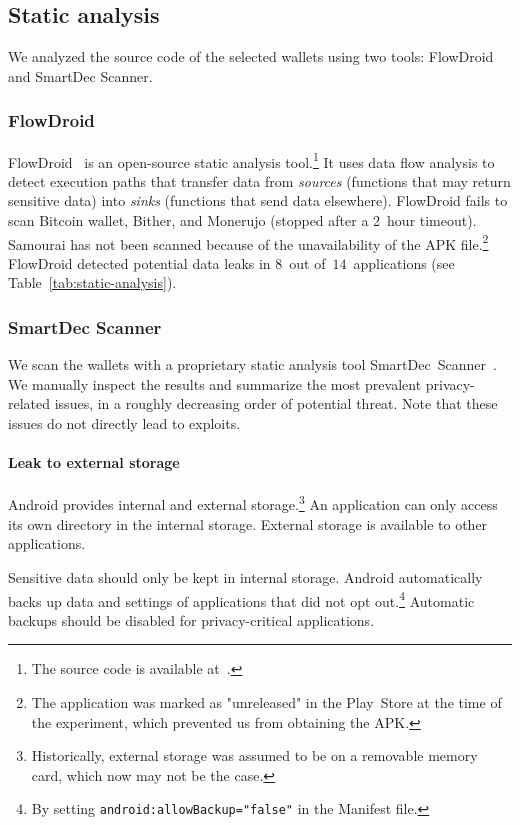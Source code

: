 \subsection{Static analysis}

We analyzed the source code of the selected wallets using two tools: FlowDroid and SmartDec Scanner.

\subsubsection*{FlowDroid}

FlowDroid~\cite{Arzt2014} is an open-source static analysis tool.\footnote{The source code is available at~\cite{FlowDroid}.}
It uses data flow analysis to detect execution paths that transfer data from \textit{sources} (functions that may return sensitive data) into \textit{sinks} (functions that send data elsewhere).
FlowDroid fails to scan Bitcoin wallet, Bither, and Monerujo (stopped after a 2~hour timeout).
Samourai has not been scanned because of the unavailability of the APK file.\footnote{The application was marked as "unreleased" in the Play~Store at the time of the experiment, which prevented us from obtaining the APK.}
FlowDroid detected potential data leaks in $8$~out of~$14$~applications (see Table~\ref{tab:static-analysis}).

\subsubsection*{SmartDec Scanner}
We scan the wallets with a proprietary static analysis tool SmartDec~Scanner~\cite{SmartDec2018}.
We manually inspect the results and summarize the most prevalent privacy-related issues, in a roughly decreasing order of potential threat.
Note that these issues do not directly lead to exploits.

\paragraph{Leak to external storage}
Android provides internal and external storage.\footnote{Historically, external storage was assumed to be on a removable memory card, which now may not be the case.}
An application can only access its own directory in the internal storage.
External storage is available to other applications.

Sensitive data should only be kept in internal storage.
Android automatically backs up data and settings of applications that did not opt out.\footnote{By setting \texttt{android:allowBackup="false"} in the Manifest file.}
Automatic backups should be disabled for privacy-critical applications.

